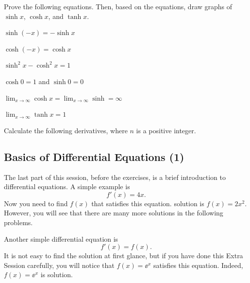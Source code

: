 \documentclass[11pt,pdfa,lastpage]{MishoNote}
\begin{document}
\ornamentskip

\begin{enumerate}[resume]
  \itemA Prove the following equations. Then, based on the equations, draw graphs of $\sinh x$, $\cosh x$, and $\tanh x$.
  \begin{menumerate}{2}
    \item $\sinh(-x)=-\sinh x$
    \item $\cosh(-x)=\cosh x$
    \item $\sinh^2x-\cosh^2x=1$
    \item $\cosh 0=1$ and $\sinh 0=0$
    \item $\displaystyle\lim_{x\to\infty}\cosh x=\lim_{x\to\infty}\sinh=\infty$
    \item $\displaystyle\lim_{x\to\infty}\tanh x=1$
  \end{menumerate}
  \itemC Calculate the following derivatives, where $n$ is a positive integer.
  \begin{menumerate}{3}
\end{menumerate}
\end{enumerate}

\newpage

\subsection{Basics of Differential Equations (1)}
The last part of this session, before the exercises, is a brief introduction to differential equations.
A simple example is
\[ f'(x)=4x. \]
Now you need to find $f(x)$ that satisfies this equation.
 solution is $f(x)=2x^2$. However, you will see that there are many more solutions in the following problems.

Another simple differential equation is
\[ f'(x) = f(x). \]
It is not easy to find the solution at first glance, but if you have done this Extra Session carefully, you will notice that $f(x)=\ee^x$ satisfies this equation. Indeed, $f(x)=\ee^x$ is  solution.

\ornamentskip
\end{document}
